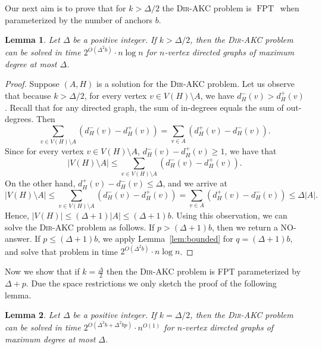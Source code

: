 \documentclass[11pt,a4paper]{article}
\newtheorem{lemma}{Lemma}
\DeclareMathOperator{\operatorClassFPT}{FPT}
\newcommand{\classFPT}{\ensuremath{\operatorClassFPT}}
\newcommand{\DAKC}{\textsc{Dir-AKC}\xspace}
\begin{document}
Our next aim is to prove that for $k>\Delta/2$ the \DAKC problem is \classFPT\ when parameterized by the number of anchors
$b$.

\begin{lemma}\label{lem:bound-deg-anchors}
Let $\Delta$ be a positive integer. If $k>\Delta/2$, then the \DAKC problem can be solved in time $2^{O(\Delta^2 b)}\cdot
n\log n$ for $n$-vertex directed graphs of maximum degree at most $\Delta$.
\end{lemma}

\begin{proof}
Suppose $(A,H)$ is a solution for the \DAKC problem. Let us observe that because $k>\Delta/2$, for every vertex $v\in
V(H)\setminus A$,  we have $d_H^-(v)>d_H^+(v)$. Recall that for any directed graph, the sum of in-degrees equals the sum of
out-degrees. Then
$$  \sum_{v\in V(H)\setminus A}(d_H^-(v)-d_H^+(v))=\sum_{v\in A}(d_H^+(v)-d_H^-(v)).$$
Since for every vertex $v\in V(H)\setminus A$,  $d_H^-(v)-d_H^+(v)\geq 1$, we have that
$$|V(H)\setminus A|\leq \sum_{v\in V(H)\setminus A}(d_H^-(v)-d_H^+(v)).$$
On the other hand,  $ d_H^+(v)-d_H^-(v)\leq \Delta$, and we arrive at
$$|V(H)\setminus A|\leq \sum_{v\in V(H)\setminus A}(d_H^-(v)-d_H^+(v))=\sum_{v\in A}(d_H^+(v)-d_H^-(v))\leq \Delta|A|.$$
Hence, $|V(H)|\leq (\Delta+1)|A|\leq (\Delta+1)b$. Using this observation, we can solve the \DAKC problem as follows. If
$p>(\Delta+1)b$, then we return a NO-answer. If $p\leq(\Delta+1)b$, we apply Lemma~\ref{lem:bounded} for $q=(\Delta+1)b$, and
solve that problem in time  $2^{O(\Delta^2 b)}\cdot n\log n$.
\end{proof}


Now we show that if $k=\frac{\Delta}{2}$ then the \DAKC problem is FPT parameterized by $\Delta+p$. Due the space restrictions we only sketch the proof of the following lemma.

\begin{lemma}\label{lem:bound-deg-saved}
Let $\Delta$ be a positive integer. If $k=\Delta/2$, then the \DAKC problem can be solved in time $2^{O(\Delta^3 b+ \Delta^2 b
p)}\cdot n^{O(1)}$ for $n$-vertex directed graphs of maximum degree at most $\Delta$.
\end{lemma}
\end{document}
